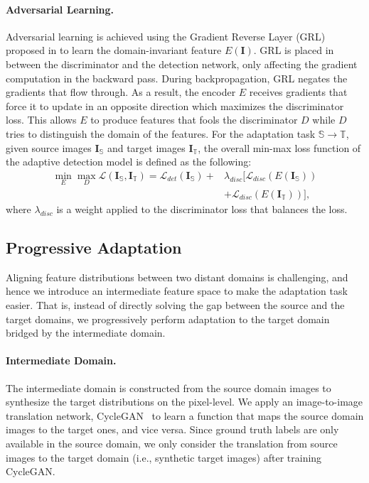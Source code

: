\documentclass[10pt,twocolumn,letterpaper]{article}
\begin{document}
\vspace{-2mm}\paragraph{Adversarial Learning.} 
Adversarial learning is achieved using the Gradient Reverse Layer (GRL) proposed in \cite{ganin2015unsupervised} to learn the domain-invariant feature $E(\mathbf{I})$.
GRL is placed in between the discriminator and the detection network, only affecting the gradient computation in the backward pass.
During backpropagation, GRL negates the gradients that flow through.
As a result, the encoder $E$ receives gradients that force it to update in an opposite direction which maximizes the discriminator loss.
This allows $E$ to produce features that fools the discriminator $D$ while $D$ tries to distinguish the domain of the features.
For the adaptation task $\mathbb{S} \rightarrow \mathbb{T}$, given source images $\mathbf{I}_\mathbb{S}$ and target images $\mathbf{I}_\mathbb{T}$, the overall min-max loss function of the adaptive detection model is defined as the following:
\begin{align}
  \min_{E} \max_{D} \mathcal{L}(\mathbf{I}_\mathbb{S}, \mathbf{I}_\mathbb{T}) = \mathcal{L}_{det}(\mathbf{I}_\mathbb{S}) + &\lambda_{disc} \big[ \mathcal{L}_{disc}(E(\mathbf{I}_\mathbb{S})) \nonumber \\
 & + \mathcal{L}_{disc}(E(\mathbf{I}_\mathbb{T})) \big],
  \label{eq:objective}
\end{align}
where $\lambda_{disc}$ is a weight applied to the discriminator loss that balances the loss. 

\subsection{Progressive Adaptation}
Aligning feature distributions between two distant domains is challenging, and hence we introduce an intermediate feature space to make the adaptation task easier.
That is, instead of directly solving the gap between the source and the target domains, we progressively perform adaptation to the target domain bridged by the intermediate domain.

\vspace{-2mm}\paragraph{Intermediate Domain.}
The intermediate domain is constructed from the source domain images to synthesize the target distributions on the pixel-level.
We apply an image-to-image translation network, CycleGAN~\cite{CycleGAN2017} to learn a function that maps the source domain images to the target ones, and vice versa.
Since ground truth labels are only available in the source domain, we only consider the translation from source images to the target domain (i.e., synthetic target images) after training CycleGAN.
\end{document}
